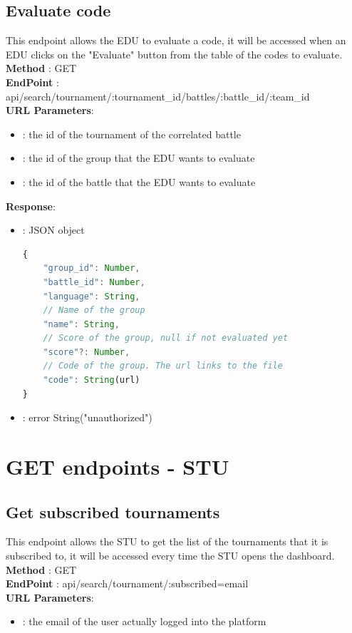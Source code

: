 \subsection*{Evaluate code}
This endpoint allows the EDU to evaluate a code, it will be accessed when an EDU clicks on the "Evaluate" button from the table of the codes to evaluate.\\
\textbf{Method} : GET \\
\textbf{EndPoint} : api/search/tournament/:tournament\_id/battles/:battle\_id/:team\_id     \\
\textbf{URL Parameters}:
\begin{itemize}
    \item {} : the id of the tournament of the correlated battle
    \item {}: the id of the group that the EDU wants to evaluate
    \item {}: the id of the battle that the EDU wants to evaluate
\end{itemize}
\textbf{Response}:
\begin{itemize}
    \item {} : JSON object
          \begin{lstlisting}[language=JavaScript, label={lst:jscode}, basicstyle=\ttfamily]
{
    "group_id": Number,
    "battle_id": Number,
    "language": String,
    // Name of the group
    "name": String,
    // Score of the group, null if not evaluated yet
    "score"?: Number,
    // Code of the group. The url links to the file
    "code": String(url)
}
    \end{lstlisting}
    \item {} : error String("unauthorized")
\end{itemize}


\section*{GET endpoints - STU}

\subsection*{Get subscribed tournaments}
This endpoint allows the STU to get the list of the tournaments that it is subscribed to, it will be accessed every time the STU opens the dashboard.\\
\textbf{Method} : GET \\
\textbf{EndPoint} : api/search/tournament/:subscribed=email     \\
\textbf{URL Parameters}:
    \begin{itemize}
        \item {} : the email of the user actually logged into the platform
    \end{itemize}

